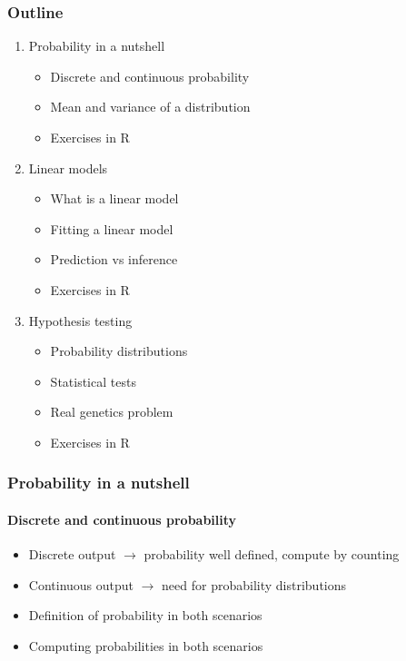 \documentclass[aspectratio=43]{beamer}
\begin{document}
\begin{frame}

	\frametitle{Outline}
	
	\begin{enumerate}
		\item {\color{blue}Probability in a nutshell}
		\begin{itemize}
			\item Discrete and continuous probability
			\item Mean and variance of a distribution
			\item Exercises in R
		\end{itemize}
		\item {\color{blue}Linear models}
		\begin{itemize}
			\item What is a linear model
			\item Fitting a linear model
			\item Prediction vs inference
			\item Exercises in R
		\end{itemize}
		\item {\color{blue}Hypothesis testing}
		\begin{itemize}
			\item Probability distributions
			\item Statistical tests
			\item Real genetics problem
			\item Exercises in R
		\end{itemize}
	\end{enumerate}
	
\end{frame}

%
%

\begin{frame}


\end{frame}

\begin{frame}

	\frametitle{Probability in a nutshell}
	\framesubtitle{Discrete and continuous probability}
	
	\footnotesize
	
	\begin{itemize}
		\item Discrete output $\longrightarrow$ probability well defined, compute by counting
		\item Continuous output $\longrightarrow$ need for probability distributions
		\item Definition of probability in both scenarios
		\item Computing probabilities in both scenarios
	\end{itemize}

\end{frame}
\end{document}

